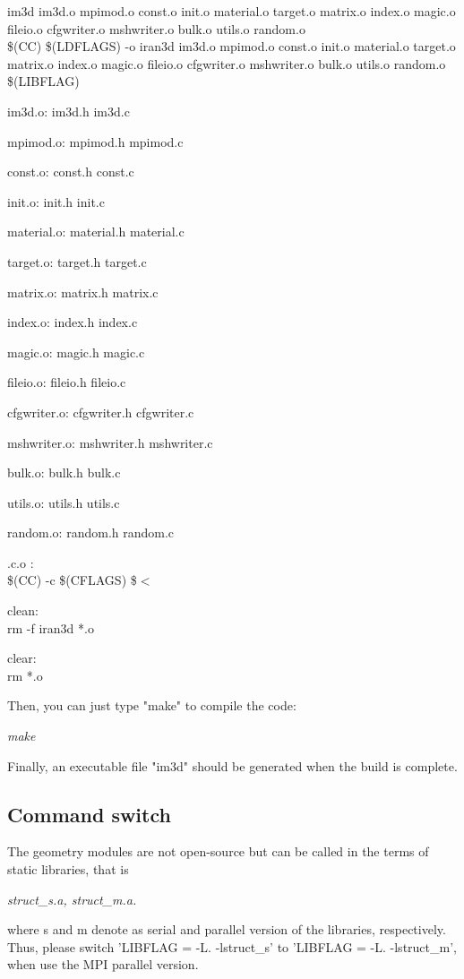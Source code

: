 im3d \: im3d.o mpimod.o const.o init.o material.o target.o matrix.o index.o magic.o fileio.o cfgwriter.o mshwriter.o bulk.o utils.o random.o\\
  \$(CC) \$(LDFLAGS) -o iran3d im3d.o mpimod.o const.o init.o material.o target.o matrix.o index.o magic.o fileio.o cfgwriter.o mshwriter.o bulk.o utils.o random.o \$(LIBFLAG)

im3d.o: im3d.h im3d.c

mpimod.o: mpimod.h mpimod.c

const.o: const.h const.c

init.o: init.h init.c

material.o: material.h material.c

target.o: target.h target.c

matrix.o: matrix.h matrix.c

index.o: index.h index.c

magic.o: magic.h magic.c

fileio.o: fileio.h fileio.c

cfgwriter.o: cfgwriter.h cfgwriter.c

mshwriter.o: mshwriter.h mshwriter.c

bulk.o: bulk.h bulk.c

utils.o: utils.h utils.c

random.o: random.h random.c

.c.o :\\
	\$(CC) -c \$(CFLAGS) \$$<$

clean:\\
	rm -f iran3d *.o

clear:\\
	rm *.o

Then, you can just type "make" to compile the code:

\quad \textsl{make}

Finally, an executable file "im3d" should be generated when the build is complete.

\subsection{Command switch}

The geometry modules are not open-source but can be called in the terms of static libraries, that is

\quad \textsl{struct\_s.a, struct\_m.a.}

where s and m denote as serial and parallel version of the libraries, respectively. Thus, please switch 'LIBFLAG = -L. -lstruct\_s' to 'LIBFLAG = -L. -lstruct\_m', when use the MPI parallel version.

